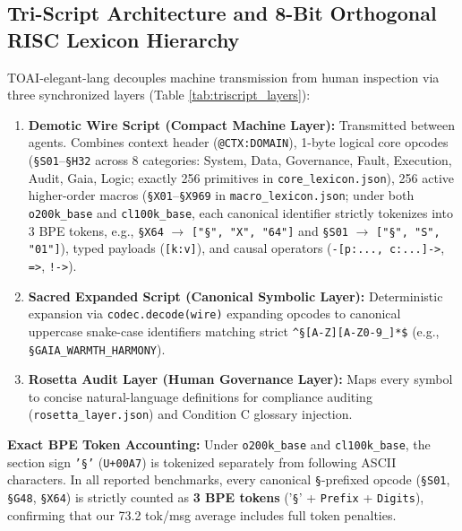 \documentclass[9pt,a4paper]{extarticle}
\begin{document}
\subsection{Tri-Script Architecture and 8-Bit Orthogonal RISC Lexicon Hierarchy}
TOAI-elegant-lang decouples machine transmission from human inspection via three synchronized layers (Table \ref{tab:triscript_layers}):
\begin{enumerate}
  \item \textbf{Demotic Wire Script (Compact Machine Layer):} Transmitted between agents. Combines context header (\texttt{@CTX:DOMAIN}), 1-byte logical core opcodes (\texttt{\S S01}--\texttt{\S H32} across 8 categories: System, Data, Governance, Fault, Execution, Audit, Gaia, Logic; exactly 256 primitives in \texttt{core\_lexicon.json}), 256 active higher-order macros (\texttt{\S X01}--\texttt{\S X969} in \texttt{macro\_lexicon.json}; under both \texttt{o200k\_base} and \texttt{cl100k\_base}, each canonical identifier strictly tokenizes into 3 BPE tokens, e.g., \texttt{\S X64} $\rightarrow$ \texttt{["\S", "X", "64"]} and \texttt{\S S01} $\rightarrow$ \texttt{["\S", "S", "01"]}), typed payloads (\texttt{[k:v]}), and causal operators (\texttt{-[p:..., c:...]->}, \texttt{=>}, \texttt{!->}).
  \item \textbf{Sacred Expanded Script (Canonical Symbolic Layer):} Deterministic expansion via \texttt{codec.decode(wire)} expanding opcodes to canonical uppercase snake-case identifiers matching strict \texttt{\^{}\S[A-Z][A-Z0-9\_]*\$} (e.g., \texttt{\S GAIA\_WARMTH\_HARMONY}).
  \item \textbf{Rosetta Audit Layer (Human Governance Layer):} Maps every symbol to concise natural-language definitions for compliance auditing (\texttt{rosetta\_layer.json}) and Condition C glossary injection.
\end{enumerate}

\textbf{Exact BPE Token Accounting:} Under \texttt{o200k\_base} and \texttt{cl100k\_base}, the section sign \texttt{'\S'} (\texttt{U+00A7}) is tokenized separately from following ASCII characters. In all reported benchmarks, every canonical \texttt{\S}-prefixed opcode (\texttt{\S S01}, \texttt{\S G48}, \texttt{\S X64}) is strictly counted as \textbf{3 BPE tokens} ('\texttt{\S}' + \texttt{Prefix} + \texttt{Digits}), confirming that our 73.2 tok/msg average includes full token penalties.
\end{document}

